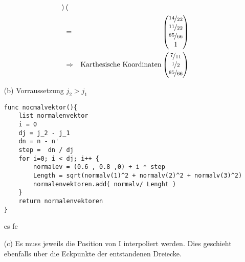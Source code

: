 \documentclass[11pt]{article}
\begin{document}
\begin{itemize}
\begin{eqnarray}
\begin{pmatrix}
\end{pmatrix}\\
&=& \begin{pmatrix}
\nicefrac{14}{22} \\ \nicefrac{11}{22} \\ \nicefrac{85}{66} \\ 1 
\end{pmatrix}\\
&\Rightarrow &  \text{Karthesische Koordinaten}
\begin{pmatrix}
\nicefrac{7}{11} \\ \nicefrac{1}{2} \\ \nicefrac{85}{66}
\end{pmatrix}
\end{eqnarray}
\newpage
\item[(b)]
Vorraussetzung $j_2 > j_1$
\begin{lstlisting}
func nocmalvektor(){
	list normalenvektor
	i = 0
	dj = j_2 - j_1
	dn = n - n'
	step =  dn / dj
	for i=0; i < dj; i++ {
		normalev = (0.6 , 0.8 ,0) + i * step
		Length = sqrt(normalv(1)^2 + normalv(2)^2 + normalv(3)^2)
		normalenvektoren.add( normalv/ Lenght )
	} 
	return normalenvektoren
}
\end{lstlisting}
es fe
\item[(c)] Es muss jeweils die Position von I interpoliert werden. Dies geschieht ebenfalls über die Eckpunkte der entstandenen Dreiecke. 
\end{itemize}
\end{document}
